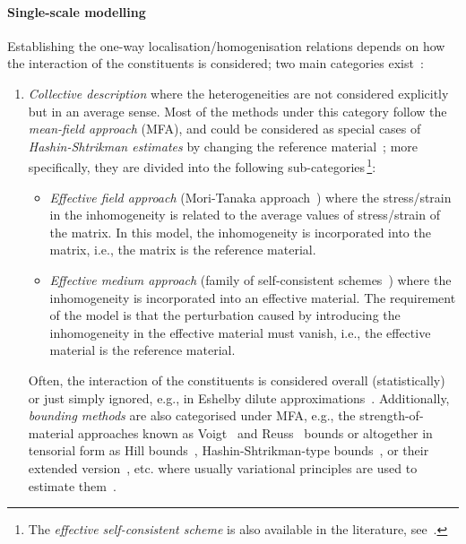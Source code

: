 	\paragraph{Single-scale modelling} Establishing the one-way localisation/homogenisation relations depends on how the interaction of the constituents is considered; two main categories exist~\autocite{Bohm.2020}:
	\begin{enumerate}
		\item \textit{Collective description} where the heterogeneities are not considered explicitly but in an average sense. Most of the methods under this category follow the \textit{mean-field approach} (MFA), and could be considered as special cases of \textit{Hashin-Shtrikman estimates} by changing the reference material~\autocite{Bohm.2004}; more specifically, they are divided into the following sub-categories\,\footnote{The \textit{effective self-consistent scheme} is also available in the literature, see~\autocite{Zheng.2001}.}:
		\begin{itemize}
			\item \textit{Effective field approach} (Mori-Tanaka approach~\autocite{Mori.1973}) where the stress/strain in the inhomogeneity is related to the average values of stress/strain of the matrix. In this model, the inhomogeneity is incorporated into the matrix, i.e., the matrix is the reference material.
			\item \textit{Effective medium approach} (family of self-consistent schemes~\autocite{Hill.1965}) where the inhomogeneity is incorporated into an effective material. The requirement of the model is that the perturbation caused by introducing the inhomogeneity in the effective material must vanish, i.e., the effective material is the reference material.
		\end{itemize}
		Often, the interaction of the constituents is considered overall (statistically) or just simply ignored, e.g., in Eshelby dilute approximations~\autocite{Eshelby.1957}. 		Additionally, \textit{bounding methods} are also categorised under MFA, e.g., the strength-of-material approaches known as Voigt~\autocite{Voigt.1889} and Reuss~\autocite{Reuss.1929} bounds or altogether in tensorial form as Hill bounds~\autocite{Hill.1951,Hill.1963}, Hashin-Shtrikman-type bounds~\autocite{Hashin.1962,Hashin.1963}, or their extended version~\autocite{Walpole.1966,Walpole.1969}, etc. where usually variational principles are used to estimate them~\autocite{Mura.1992,Hu.1984}.

\end{enumerate}
